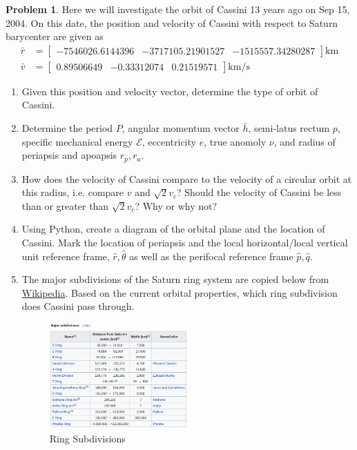 \documentclass[10pt]{article}
\theoremstyle{definition}
\newtheorem{prob}{Problem}[section]
\newenvironment{subprob}%
{\renewcommand{\theenumi}{\alph{enumi}}\renewcommand{\labelenumi}{(\theenumi)}\begin{enumerate}}%
{\end{enumerate}}%
\begin{document}
\begin{prob}
    Here we will investigate the orbit of Cassini 13 years ago on Sep 15, 2004.
    On this date, the position and velocity of Cassini with respect to Saturn barycenter are given as 
    \begin{align*}
    \bar{r} &= \begin{bmatrix} -7546026.6144396 & -3717105.21901527 & -1515557.34280287\end{bmatrix} \si{\kilo\meter} \\
    \bar{v} &= \begin{bmatrix}  0.89506649 & -0.33312074  & 0.21519571 \end{bmatrix} \si{\kilo\meter\per\second}
    \end{align*}

    \begin{subprob}
        \item Given this position and velocity vector, determine the type of orbit of Cassini.
        \item Determine the period \( P \), angular momentum vector \( \bar h \), semi-latus rectum \( p \), specific mechanical energy \( \mathcal{E}\), eccentricity \( e \), true anomoly \( \nu \), and radius of periapsis and apoapsis \( r_p, r_a\).
        \item How does the velocity of Cassini compare to the velocity of a circular orbit at this radius, i.e. compare \( v \) and \( \sqrt{2} v_c \)?
            Should the velocity of Cassini be less than or greater than \( \sqrt{2} v_c \)? Why or why not?
        \item Using Python, create a diagram of the orbital plane and the location of Cassini.
            Mark the location of periapsis and the local horizontal/local vertical unit reference frame, \( \hat r, \hat \theta \) as well as the perifocal reference frame \( \hat p, \hat q \).
        \item The major subdivisions of the Saturn ring system are copied below from \href{https://en.wikipedia.org/wiki/Rings_of_Saturn#Major_subdivisions}{Wikipedia}.
            Based on the current orbital properties, which ring subdivision does Cassini pass through.
            \begin{figure}[htbp]
                \centering
                \includegraphics[width=0.5\textwidth]{figures/ring_subdivisions.png}
                \caption{Ring Subdivisions}
            \end{figure}
    \end{subprob}
\end{prob}
\end{document}
